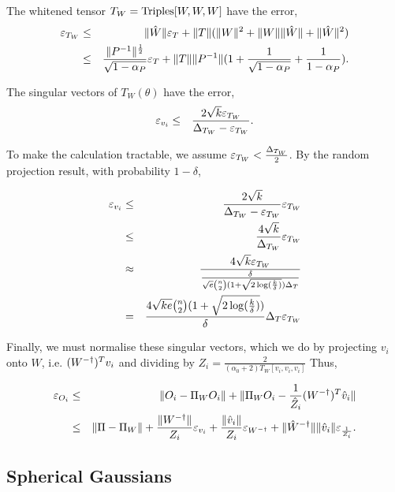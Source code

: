 The whitened tensor $T_W = \mathrm{Triples}[W,W,W]$ have the error, 
\begin{eqnarray}
  \varepsilon_{T_W} 
    &\le& \|\hat{W}\| \varepsilon_{T} + \|T\| (\|W\|^2 + \|W\|\|\hat{W}\| + \|\hat{W}\|^2 ) \\
    &\le& \frac{\|P^{-1}\|^{\frac{1}{2}}}{\sqrt{1 - \alpha_P}} \varepsilon_{T} + \|T\| \|P^{-1}\| (1 + \frac{1}{\sqrt{1 - \alpha_P}} + \frac{1}{1 - \alpha_P}).
\end{eqnarray}

The singular vectors of $T_W(\theta)$ have the error,
\begin{eqnarray}
  \varepsilon_{v_i} 
    &\le& \frac{2 \sqrt{k} \varepsilon_{T_W}}{\Delta_{T_W} - \varepsilon_{T_W}}.
\end{eqnarray}

To make the calculation tractable, we assume $\varepsilon_{T_W}
< \frac{\Delta_{T_W}}{2}$. By the random projection result, with probability $1-\delta$,  

\begin{eqnarray}
  \varepsilon_{v_i} 
    &\le& \frac{2 \sqrt{k}}{\Delta_{T_W} - \varepsilon_{T_W}}  \varepsilon_{T_W}\\
    &\le& \frac{4 \sqrt{k}}{\Delta_{T_W}}  \varepsilon_{T_W}\\
    &\approx& \frac{4 \sqrt{k} \varepsilon_{T_W}}{\frac{\delta}{\sqrt{e} \binom{n}{2} (1 + \sqrt{2\log(\frac{k}{\delta})}) \Delta_{T}}} \\
    &=& \frac{4 \sqrt{ke} \binom{n}{2} (1 + \sqrt{2\log(\frac{k}{\delta})})}{\delta} \Delta_{T} \varepsilon_{T_W}
\end{eqnarray}


Finally, we must normalise these singular vectors, which we do by
projecting $v_i$ onto $W$, i.e. $(W^{-\dagger})^T v_i$ and dividing by $Z_i
= \frac{2}{(\alpha_0 + 2) T_W[v_i, v_i, v_i]}$ Thus, 

\begin{eqnarray}
  \varepsilon_{O_i} 
  &\le& \| O_i - \Pi_W O_i \| + \| \Pi_W O_i - \frac{1}{\hat{Z}_i} (W^{-\dagger})^T \hat{v}_i \| \\
  &\le& \|\Pi - \Pi_W\| 
  + \frac{\|W^{-\dagger}\|}{Z_i} \varepsilon_{v_i} 
  + \frac{\|\hat{v}_i\|}{Z_i} \varepsilon_{W^{-\dagger}} 
  + \|\hat{W}^{-\dagger}\| \|\hat{v}_i\| \varepsilon_{\frac{1}{Z_i}}.
\end{eqnarray}

\subsection{Spherical Gaussians}

